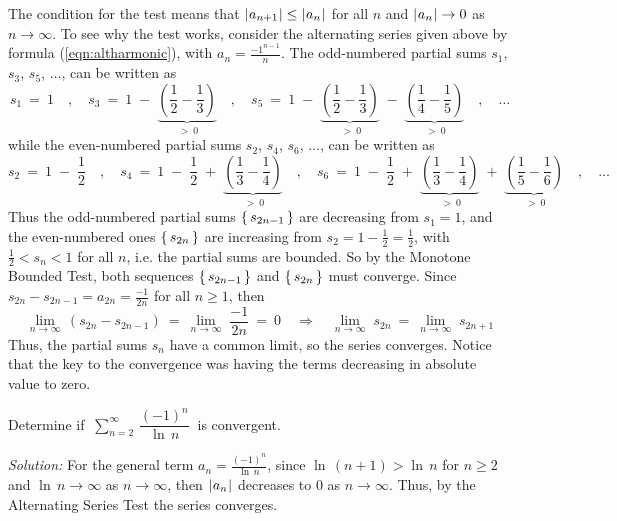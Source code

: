 \noindent The condition for the test means that $\lvert\mspace{1mu}a_{n+1}\mspace{1mu}\rvert \le \lvert\mspace{1mu}a_n\mspace{1mu}\rvert$
for all $n$ and $\lvert\mspace{1mu}a_n\mspace{1mu}\rvert \rightarrow 0$ as $n \rightarrow \infty$. To see why
the test works, consider the alternating series given above by formula
(\ref{eqn:altharmonic}), with $a_n=\frac{-1^{n-1}}{n}$. The odd-numbered partial
sums $s_1$, $s_3$, $s_5$, $\ldots$, can be written as
\[
s_1 ~=~ 1 \quad,\quad
s_3 ~=~ 1 \;-\; \underbrace{\left(\frac{1}{2} - \frac{1}{3}\right)}_{~>~ 0} \quad,\quad
s_5 ~=~ 1 \;-\; \underbrace{\left(\frac{1}{2} - \frac{1}{3}\right)}_{~>~ 0} \;-\; 
        \underbrace{\left(\frac{1}{4} - \frac{1}{5}\right)}_{~>~ 0} \quad,\quad\ldots
\]
while the even-numbered partial sums $s_2$, $s_4$, $s_6$, $\ldots$, can be
written as
\[
s_2 ~=~ 1 \;-\; \frac{1}{2} \quad,\quad
s_4 ~=~ 1 \;-\; \frac{1}{2} \;+\; \underbrace{\left(\frac{1}{3} - \frac{1}{4}\right)}_{~>~ 0} \quad,\quad
s_6 ~=~ 1 \;-\; \frac{1}{2} \;+\; \underbrace{\left(\frac{1}{3} - \frac{1}{4}\right)}_{~>~ 0} \;+\; 
        \underbrace{\left(\frac{1}{5} - \frac{1}{6}\right)}_{~>~ 0} \quad,\quad\ldots
\]
Thus the odd-numbered partial sums $\left\lbrace\mspace{3mu}s_{2n-1}\mspace{3mu}\right\rbrace$ are decreasing from $s_1=1$,
and the even-numbered ones $\left\lbrace\mspace{3mu}s_{2n}\mspace{3mu}\right\rbrace$ are increasing from
$s_2=1-\frac{1}{2}=\frac{1}{2}$, with $\frac{1}{2} < s_n < 1$ for all $n$, i.e. the
partial sums are bounded. So by the Monotone Bounded Test, both sequences
$\left\lbrace\mspace{3mu}s_{2n-1}\mspace{3mu}\right\rbrace$ and $\left\lbrace\mspace{3mu}s_{2n}\mspace{3mu}\right\rbrace$ must converge. Since
$s_{2n} - s_{2n-1} = a_{2n} = \frac{-1}{2n}$ for all $n \ge 1$, then
\[
\lim_{n \to \infty} \,(s_{2n} - s_{2n-1}) ~=~ \lim_{n \to \infty} \;\frac{-1}{2n} ~=~ 0
\quad\Rightarrow\quad \lim_{n \to \infty} \;s_{2n} ~=~ \lim_{n \to \infty} \;s_{2n+1}
\]
Thus, the partial sums $s_n$ have a common limit, so the series converges.
Notice that the key to the convergence was having the terms decreasing in
absolute value to zero.
\newpage
\begin{exmp}
\noindent Determine if
$~\displaystyle\sum_{n=2}^{\infty} \,\dfrac{(-1)^{n}}{\ln \,n}~$ is
convergent.\vspace{1mm}
\par\noindent\emph{Solution:} For the general term
$a_n = \frac{(-1)^{n}}{\ln \,n}$, since $\ln\,(n+1) > \ln\,n$ for $n\ge 2$ and
$\ln\,n \rightarrow \infty$ as $n \rightarrow \infty$, then $\lvert\mspace{1mu}a_n\mspace{1mu}\rvert$
decreases to 0 as $n \rightarrow \infty$. Thus, by the Alternating Series Test
the series converges.
\end{exmp}
\divider
\vspace{2mm}

